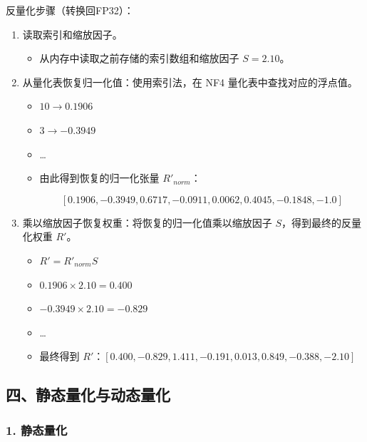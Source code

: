 反量化步骤（转换回FP32）：

\begin{enumerate}
\def\labelenumi{\arabic{enumi}.}
\item
  读取索引和缩放因子。

  \begin{itemize}
  \tightlist
  \item
    从内存中读取之前存储的索引数组和缩放因子 \(S = 2.10\)。
  \end{itemize}
\item
  从量化表恢复归一化值：使用索引法，在 NF4 量化表中查找对应的浮点值。

  \begin{itemize}
  \tightlist
  \item
    \(10 \to 0.1906\)
  \item
    \(3 \to -0.3949\)
  \item
    \ldots{}
  \item
    由此得到恢复的归一化张量 \(R'_{norm}\)：

\[
[0.1906, -0.3949, 0.6717, -0.0911, 0.0062, 0.4045, -0.1848, -1.0]
\]
  \end{itemize}
\item
  乘以缩放因子恢复权重：将恢复的归一化值乘以缩放因子 \(S\)，得到最终的反量化权重 \(R'\)。

  \begin{itemize}
  \tightlist
  \item
    \(R' = R'_{norm}S\)
  \item
    \(0.1906 \times 2.10 = 0.400\)
  \item
    \(-0.3949 \times 2.10 = -0.829\)
  \item
    \ldots{}
  \item
    最终得到 \(R'\)：\([0.400, -0.829, 1.411, -0.191, 0.013, 0.849, -0.388, -2.10]\)
  \end{itemize}
\end{enumerate}

\hypertarget{ux56dbux9759ux6001ux91cfux5316ux4e0eux52a8ux6001ux91cfux5316}{%
\subsection{四、静态量化与动态量化}\label{ux56dbux9759ux6001ux91cfux5316ux4e0eux52a8ux6001ux91cfux5316}}

\hypertarget{ux9759ux6001ux91cfux5316}{%
\subsubsection{1. 静态量化}\label{ux9759ux6001ux91cfux5316}}

